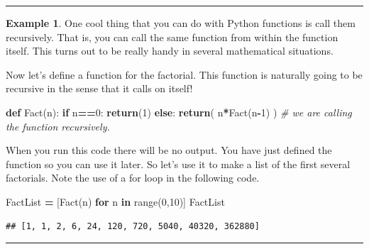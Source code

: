 \documentclass[
]{book}
\newenvironment{Shaded}{\begin{snugshade}}{\end{snugshade}}
\newcommand{\BuiltInTok}[1]{#1}
\newcommand{\CommentTok}[1]{\textcolor[rgb]{0.56,0.35,0.01}{\textit{#1}}}
\newcommand{\ControlFlowTok}[1]{\textcolor[rgb]{0.13,0.29,0.53}{\textbf{#1}}}
\newcommand{\DecValTok}[1]{\textcolor[rgb]{0.00,0.00,0.81}{#1}}
\newcommand{\KeywordTok}[1]{\textcolor[rgb]{0.13,0.29,0.53}{\textbf{#1}}}
\newcommand{\NormalTok}[1]{#1}
\newcommand{\OperatorTok}[1]{\textcolor[rgb]{0.81,0.36,0.00}{\textbf{#1}}}
\theoremstyle{definition}
\theoremstyle{definition}
\newtheorem{example}{Example}[chapter]
\theoremstyle{definition}
\theoremstyle{remark}
\begin{document}
\begin{center}\rule{0.5\linewidth}{0.5pt}\end{center}

\begin{example}
\protect\hypertarget{exm:unnamed-chunk-682}{}{\label{exm:unnamed-chunk-682} }One cool thing that you can do with Python functions is call them recursively. That is, you can call the same function from within the function itself. This turns out to be really handy in several mathematical situations.

Now let's define a function for the factorial. This function is naturally going to be recursive in the sense that it calls on itself!
\end{example}

\begin{Shaded}
\begin{Highlighting}[]
\KeywordTok{def}\NormalTok{ Fact(n):}
    \ControlFlowTok{if}\NormalTok{ n}\OperatorTok{==}\DecValTok{0}\NormalTok{:}
        \ControlFlowTok{return}\NormalTok{(}\DecValTok{1}\NormalTok{)}
    \ControlFlowTok{else}\NormalTok{:}
        \ControlFlowTok{return}\NormalTok{( n}\OperatorTok{*}\NormalTok{Fact(n}\OperatorTok{{-}}\DecValTok{1}\NormalTok{) ) }\CommentTok{\# we are calling the function recursively.}
\end{Highlighting}
\end{Shaded}

When you run this code there will be no output. You have just defined the function so you can use it later. So let's use it to make a list of the first several factorials. Note the use of a for loop in the following code.

\begin{Shaded}
\begin{Highlighting}[]
\NormalTok{FactList }\OperatorTok{=}\NormalTok{ [Fact(n) }\ControlFlowTok{for}\NormalTok{ n }\KeywordTok{in} \BuiltInTok{range}\NormalTok{(}\DecValTok{0}\NormalTok{,}\DecValTok{10}\NormalTok{)]}
\NormalTok{FactList}
\end{Highlighting}
\end{Shaded}

\begin{verbatim}
## [1, 1, 2, 6, 24, 120, 720, 5040, 40320, 362880]
\end{verbatim}

\begin{center}\rule{0.5\linewidth}{0.5pt}\end{center}
\end{document}
